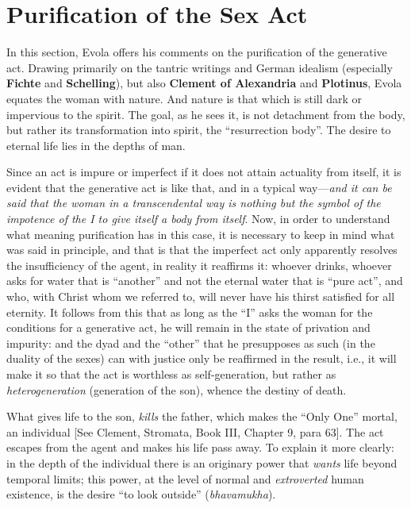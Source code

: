 \section{Purification of the Sex Act}

\begin{quotex}
In this section, Evola offers his comments on the purification of the generative act. Drawing primarily on the tantric writings and German idealism (especially \textbf{Fichte} and \textbf{Schelling}), but also \textbf{Clement of Alexandria} and \textbf{Plotinus}, Evola equates the woman with nature. And nature is that which is still dark or impervious to the spirit. The goal, as he sees it, is not detachment from the body, but rather its transformation into spirit, the “resurrection body”. The desire to eternal life lies in the depths of man. 

\end{quotex}
Since an act is impure or imperfect if it does not attain actuality from itself, it is evident that the generative act is like that, and in a typical way—\textit{and it can be said that the woman in a transcendental way is nothing but the symbol of the impotence of the I to give itself a body from itself}. Now, in order to understand what meaning purification has in this case, it is necessary to keep in mind what was said in principle, and that is that the imperfect act only apparently resolves the insufficiency of the agent, in reality it reaffirms it: whoever drinks, whoever asks for water that is “another” and not the eternal water that is “pure act”, and who, with Christ whom we referred to, will never have his thirst satisfied for all eternity. It follows from this that as long as the “I” asks the woman for the conditions for a generative act, he will remain in the state of privation and impurity: and the dyad and the “other” that he presupposes as such (in the duality of the sexes) can with justice only be reaffirmed in the result, i.e., it will make it so that the act is worthless as self-generation, but rather as \textit{heterogeneration} (generation of the son), whence the destiny of death.

What gives life to the son, \textit{kills} the father, which makes the “Only One” mortal, an individual [See Clement, Stromata, Book III, Chapter 9, para 63]. The act escapes from the agent and makes his life pass away. To explain it more clearly: in the depth of the individual there is an originary power that \textit{wants} life beyond temporal limits; this power, at the level of normal and \textit{extroverted} human existence, is the desire “to look outside” (\textit{bhavamukha}).

